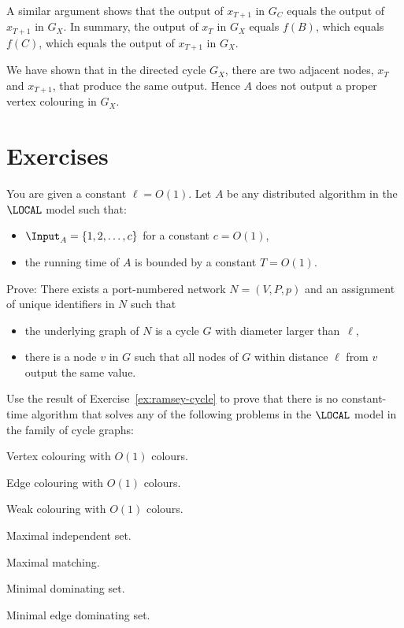 A similar argument shows that the output of $x_{T+1}$ in $G_C$ equals the output of $x_{T+1}$ in $G_X$. In summary, the output of $x_{T}$ in $G_X$ equals $f(B)$, which equals $f(C)$, which equals the output of $x_{T+1}$ in $G_X$.

We have shown that in the directed cycle $G_X$, there are two adjacent nodes, $x_T$ and $x_{T+1}$, that produce the same output. Hence $A$ does not output a proper vertex colouring in $G_X$.


\section{Exercises}

\begin{ex}\label{ex:ramsey-cycle}
    You are given a constant $\ell = O(1)$. Let $A$ be any distributed algorithm in the $\LOCAL$ model such that:
    \begin{itemize}[noitemsep]
        \item $\Input_A = \{1,2,\dotsc,c\}$ for a constant $c = O(1)$,
        \item the running time of $A$ is bounded by a constant $T = O(1)$.
    \end{itemize}
    Prove: There exists a port-numbered network $N=(V,P,p)$ and an assignment of unique identifiers in $N$ such that
    \begin{itemize}
        \item the underlying graph of $N$ is a cycle $G$ with diameter larger than~$\ell$,
        \item there is a node $v$ in $G$ such that all nodes of $G$ within distance $\ell$ from $v$ output the same value.
    \end{itemize}
\end{ex}

\begin{ex}\label{ex:ramsey-cycle-app}
    Use the result of Exercise~\ref{ex:ramsey-cycle} to prove that there is no constant-time algorithm that solves any of the following problems in the $\LOCAL$ model in the family of cycle graphs:
    \begin{subex}[noitemsep]
        \item Vertex colouring with $O(1)$ colours.
        \item Edge colouring with $O(1)$ colours.
        \item Weak colouring with $O(1)$ colours.
        \item Maximal independent set.
        \item Maximal matching.
        \item Minimal dominating set.
        \item Minimal edge dominating set.
    \end{subex}
\end{ex}

